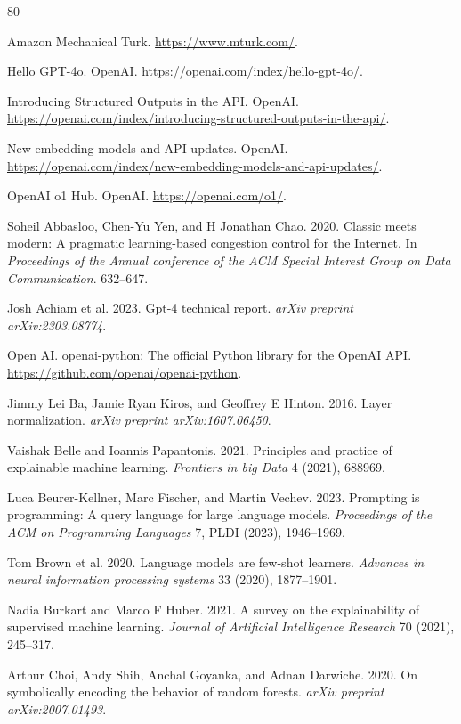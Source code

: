 \documentclass[11pt,a4paper]{article}
\begin{document}
\begin{thebibliography}{80}

 Amazon Mechanical Turk. \url{https://www.mturk.com/}.

 Hello GPT-4o. OpenAI. \url{https://openai.com/index/hello-gpt-4o/}.

 Introducing Structured Outputs in the API. OpenAI. \url{https://openai.com/index/introducing-structured-outputs-in-the-api/}.

 New embedding models and API updates. OpenAI. \url{https://openai.com/index/new-embedding-models-and-api-updates/}.

 OpenAI o1 Hub. OpenAI. \url{https://openai.com/o1/}.

 Soheil Abbasloo, Chen-Yu Yen, and H Jonathan Chao. 2020. Classic meets modern: A pragmatic learning-based congestion control for the Internet. In \emph{Proceedings of the Annual conference of the ACM Special Interest Group on Data Communication}. 632--647.

 Josh Achiam et al. 2023. Gpt-4 technical report. \emph{arXiv preprint arXiv:2303.08774}.

 Open AI. openai-python: The official Python library for the OpenAI API. \url{https://github.com/openai/openai-python}.

 Jimmy Lei Ba, Jamie Ryan Kiros, and Geoffrey E Hinton. 2016. Layer normalization. \emph{arXiv preprint arXiv:1607.06450}.

 Vaishak Belle and Ioannis Papantonis. 2021. Principles and practice of explainable machine learning. \emph{Frontiers in big Data} 4 (2021), 688969.

 Luca Beurer-Kellner, Marc Fischer, and Martin Vechev. 2023. Prompting is programming: A query language for large language models. \emph{Proceedings of the ACM on Programming Languages} 7, PLDI (2023), 1946--1969.

 Tom Brown et al. 2020. Language models are few-shot learners. \emph{Advances in neural information processing systems} 33 (2020), 1877--1901.

 Nadia Burkart and Marco F Huber. 2021. A survey on the explainability of supervised machine learning. \emph{Journal of Artificial Intelligence Research} 70 (2021), 245--317.

 Arthur Choi, Andy Shih, Anchal Goyanka, and Adnan Darwiche. 2020. On symbolically encoding the behavior of random forests. \emph{arXiv preprint arXiv:2007.01493}.


\end{thebibliography}
\end{document}
